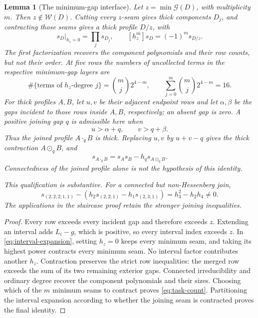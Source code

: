 \documentclass[11pt,a4paper]{amsart}
\numberwithin{equation}{section}
\theoremstyle{plain}
\newtheorem{lemma}[theorem]{Lemma}
\theoremstyle{definition}
\begin{document}
\begin{lemma}[The minimum-gap interface]\label{lem:staircase-minimum}
Let \(z=\min\mathcal G(D)\), with multiplicity \(m\).  Then
\(z\notin\mathcal W(D)\).  Cutting every \(z\)-seam gives thick
components \(D_j\), and contracting those seams gives a thick profile
\(D/z\), with
\[
 s_D\big|_{h_z=0}=\prod_j s_{D_j},\qquad
 [h_z^m]s_D=(-1)^m s_{D/z}.
\]
The first factorization recovers the component polynomials and their row
counts, but not their order.  At five rows the numbers of uncollected terms
in the respective minimum-gap layers are
\begin{equation}\label{eq:task-count}
 \#\{\text{terms of }h_z\text{-degree }j\}
   =\binom mj2^{4-m},\qquad
 \sum_{j=0}^m\binom mj2^{4-m}=16.
\end{equation}
For thick profiles \(A,B\), let \(u,v\) be their adjacent endpoint
rows and let \(\alpha,\beta\) be the gaps incident to those rows inside
\(A,B\), respectively; an absent gap is zero.  A positive joining gap
\(q\) is admissible here when
\[
 u>\alpha+q,\qquad v>q+\beta.
\]
Thus the joined profile \(A\cdot_qB\) is thick.  Replacing \(u,v\)
by \(u+v-q\) gives the thick contraction \(A\odot_qB\), and
\[
 s_{A\cdot_qB}=s_As_B-h_qs_{A\odot_qB}.
\]
Connectedness of the joined profile alone is not the hypothesis of this
identity.

This qualification is substantive.  For a connected but non-Hessenberg join,
\[
s_{(2,2,2;1,1)}
-\left(h_2s_{(2,2;1)}-h_1s_{(2,3;1)}\right)
=h_3^2-h_2h_4\ne0.
\]
The applications in the staircase proof retain the stronger joining inequalities.
\end{lemma}

\begin{proof}
Every row exceeds every incident gap and therefore exceeds \(z\).
Extending an interval adds \(L_i-g\), which is positive, so every interval
index exceeds \(z\).  In \eqref{eq:interval-expansion}, setting \(h_z=0\)
keeps every minimum seam, and taking its highest power contracts every
minimum seam.  No interval factor contributes another \(h_z\).
Contraction preserves the strict row inequalities: the merged row exceeds
the sum of its two remaining exterior gaps.  Connected irreducibility
\cite{Barekat2009CoincidencesCorrigendum} and ordinary degree recover the
component polynomials and their sizes.  Choosing which of the \(m\)
minimum seams to contract proves \eqref{eq:task-count}.  Partitioning the
interval expansion according to whether the joining seam is contracted
proves the final identity.
\end{proof}
\end{document}
